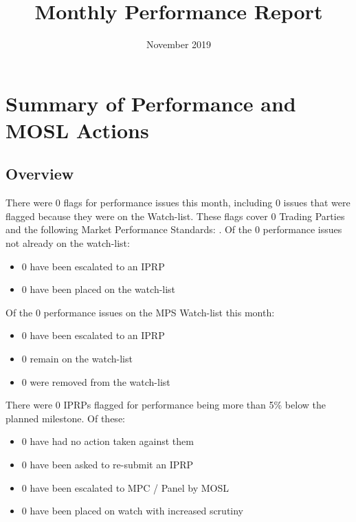 \documentclass[12pt,table]{article}
\title{Monthly Performance Report}
\author{}
\date{November 2019}
\providecommand{\tightlist}{%
  \setlength{\itemsep}{0pt}\setlength{\parskip}{0pt}}
\begin{document}
\maketitle

{
\setcounter{tocdepth}{2}
\tableofcontents
}
\newpage

\hypertarget{summary-of-performance-and-mosl-actions}{%
\section{Summary of Performance and MOSL
Actions}\label{summary-of-performance-and-mosl-actions}}

\hypertarget{overview}{%
\subsection{Overview}\label{overview}}

There were 0 flags for performance issues this month, including 0 issues
that were flagged because they were on the Watch-list. These flags cover
0 Trading Parties and the following Market Performance Standards: . Of
the 0 performance issues not already on the watch-list:

\begin{itemize}
\tightlist
\item
  0 have been escalated to an IPRP
\item
  0 have been placed on the watch-list
\end{itemize}

Of the 0 performance issues on the MPS Watch-list this month:

\begin{itemize}
\tightlist
\item
  0 have been escalated to an IPRP
\item
  0 remain on the watch-list
\item
  0 were removed from the watch-list
\end{itemize}

There were 0 IPRPs flagged for performance being more than 5\% below the
planned milestone. Of these:

\begin{itemize}
\tightlist
\item
  0 have had no action taken against them
\item
  0 have been asked to re-submit an IPRP
\item
  0 have been escalated to MPC / Panel by MOSL
\item
  0 have been placed on watch with increased scrutiny
\end{itemize}
\end{document}
